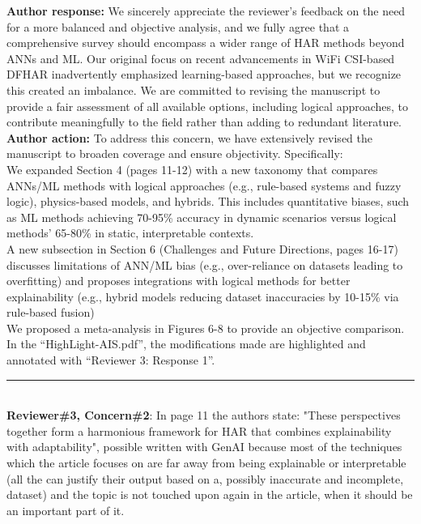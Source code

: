 \documentclass[Afour,sageh,times]{sagej}
\begin{document}
\textbf{Author response:} We sincerely appreciate the reviewer's feedback on the need for a more balanced and objective analysis, and we fully agree that a comprehensive survey should encompass a wider range of HAR methods beyond ANNs and ML. Our original focus on recent advancements in WiFi CSI-based DFHAR inadvertently emphasized learning-based approaches, but we recognize this created an imbalance. We are committed to revising the manuscript to provide a fair assessment of all available options, including logical approaches, to contribute meaningfully to the field rather than adding to redundant literature.\\
\textbf{Author action:} To address this concern, we have extensively revised the manuscript to broaden coverage and ensure objectivity. Specifically:\\
We expanded Section 4 (pages 11-12) with a new taxonomy that compares ANNs/ML methods with logical approaches (e.g., rule-based systems and fuzzy logic), physics-based models, and hybrids. This includes quantitative biases, such as ML methods achieving 70-95\% accuracy in dynamic scenarios versus logical methods' 65-80\% in static, interpretable contexts.\\
A new subsection in Section 6 (Challenges and Future Directions, pages 16-17) discusses limitations of ANN/ML bias (e.g., over-reliance on datasets leading to overfitting) and proposes integrations with logical methods for better explainability (e.g., hybrid models reducing dataset inaccuracies by 10-15\% via rule-based fusion)\\
We proposed a meta-analysis in Figures 6-8 to provide an objective comparison.\\

\textcolor{myOrange}{
In the “HighLight-AIS.pdf”, the modifications made are highlighted and annotated with “Reviewer 3: Response 1”.}\\  

\color{gray}\rule{\linewidth}{1pt}\normalcolor\\

\textcolor{myGreen}{ \textbf{Reviewer\#3, Concern\#2}: In page 11 the authors state: "These perspectives together form a harmonious framework for HAR that combines explainability with adaptability", possible written with GenAI because most of the techniques which the article focuses on are far away from being explainable or interpretable (all the can justify their output based on a, possibly inaccurate and incomplete, dataset) and the topic is not touched upon again in the article, when it should be an important part of it.}  \\  
\end{document}
